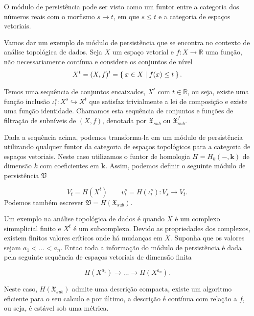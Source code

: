 O módulo de persistência pode ser visto como um funtor entre a categoria dos números reais com o morfismo
$s \to t$, em que $s \leq t$ e a categoria de espaços vetoriais. 

Vamos dar um exemplo de módulo de persistência que se encontra no contexto de análise topológica de dados. 
Seja $X$ um espaço vetorial e $f \colon X \to \mathbb{R}$ uma função, não necessariamente contínua e 
considere os conjuntos de nível
\begin{equation*}
    X^t = (X,f)^t = \Set{x \in X \mid f(x) \leq t}.
\end{equation*}

Temos uma sequência de conjuntos encaixados, $X^t$ com $t \in \mathbb{R}$, ou seja, existe uma função 
inclusão $\iota_t^s \colon X^s \hookrightarrow X^t$ que satisfaz trivialmente a lei de composição e 
existe uma função identidade. Chamamos esta sequência de conjuntos e funções de filtração de subníveis
de $(X,f)$, denotada por $\mathfrak{X}_{sub}$ ou $\mathfrak{X}^f_{sub}$.

Dada a sequência acima, podemos transforma-la em um módulo de persistência utilizando qualquer funtor
da categoria de espaços topológicos para a categoria de espaços vetoriais. Neste caso utilizamos 
o funtor de homologia $H = H_k(-, \mathbf{k})$ de dimensão $k$ com coeficientes em $\mathbf{k}$. Assim,
podemos definir o seguinte módulo de persistência $\mathfrak{V}$

\begin{equation*}
    V_t = H(X^t) \qquad v^s_t = H(\iota_t^s) \colon V_s \to V_t.
\end{equation*}
Podemos também escrever $\mathfrak{V} = H(\mathfrak{X}_{sub})$. 

Um exemplo na análise topológica de dados é quando $X$ é um complexo simmplicial finito e $X^t$ é um 
subcomplexo. Devido as propriedades dos complexos, existem finitos valores críticos onde há mudanças 
em $X$. Suponha que os valores sejam $a_1 < \dots < a_n$. Entao toda a informação do módulo de 
persistência é dada pela seguinte sequência de espaços vetoriais de dimensão finita

\begin{equation*}
    H(X^{a_1}) \to \dots \to H(X^{a_n}).
\end{equation*}

Neste caso, $H(\mathfrak{X}_{sub})$ admite uma descrição compacta, existe um algoritmo eficiente para 
o seu calculo e por último, a descrição é contínua com relação a $f$, ou seja, é estável sob uma 
métrica. 

